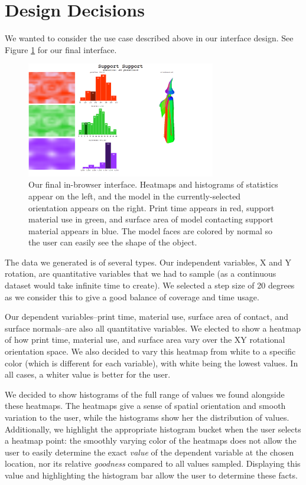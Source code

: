 \documentclass{sigchi}
\begin{document}
\section{Design Decisions}
We wanted to consider the use case described above in our interface design.  See Figure \ref{fig:full} for our final interface.

\begin{figure}
\centering
\includegraphics[width=3.25in]{images/fullInterface.png}
\caption{Our final in-browser interface.  Heatmaps and histograms of statistics appear on the left, and the model in the currently-selected orientation appears on the right.  Print time appears in red, support material use in green, and surface area of model contacting support material appears in blue.  The model faces are colored by normal so the user can easily see the shape of the object.}
\label{fig:full}
\end{figure}

The data we generated is of several types.  Our independent variables, X and Y rotation, are quantitative variables that we had to sample (as a continuous dataset would take infinite time to create).  We selected a step size of 20 degrees as we consider this to give a good balance of coverage and time usage.

Our dependent variables--print time, material use, surface area of contact, and surface normals--are also all quantitative variables.  We elected to show a heatmap of how print time, material use, and surface area vary over the XY rotational orientation space.  We also decided to vary this heatmap from white to a specific color (which is different for each variable), with white being the lowest values.  In all cases, a whiter value is better for the user.

We decided to show histograms of the full range of values we found alongside these heatmaps.  The heatmaps give a sense of spatial orientation and smooth variation to the user, while the histograms show her the distribution of values.  Additionally, we highlight the appropriate histogram bucket when the user selects a heatmap point: the smoothly varying color of the heatmaps does not allow the user to easily determine the exact \emph{value} of the dependent variable at the chosen location, nor its relative \emph{goodness} compared to all values sampled.  Displaying this value and highlighting the histogram bar allow the user to determine these facts.
\end{document}
